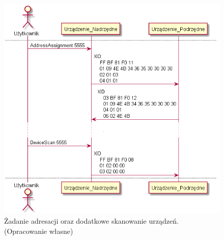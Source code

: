 \begin{figure}[h!]
    \centering
    \includegraphics[scale=0.75]{out/Diagramy/UML_DiagramOfSequence_New/UML_DiagramOfSequence_New-page2.png}
    \caption{Żadanie adresacji oraz dodatkowe skanowanie urządzeń.
        \newline(Opracowanie własne)}
    \label{fig:DiagramSequence_AddressAssignment_SecondDeviceScan}
\end{figure}
